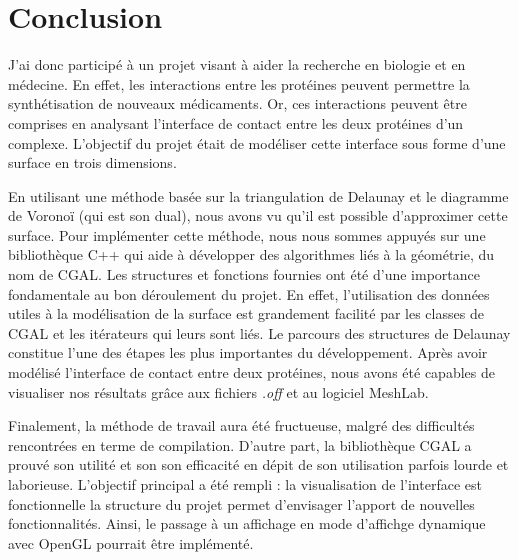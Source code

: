\chapter*{Conclusion}

J'ai donc participé à un projet visant à aider la recherche en biologie et en médecine.
En effet, les interactions entre les protéines peuvent permettre la synthétisation de
nouveaux médicaments. Or, ces interactions peuvent être comprises en analysant l'interface
de contact entre les deux protéines d'un complexe. L'objectif du projet était de modéliser
cette interface sous forme d'une surface en trois dimensions.

En utilisant une méthode basée sur la triangulation de Delaunay et le diagramme de
Voronoï (qui est son dual), nous avons vu qu'il est possible d'approximer cette surface.
Pour implémenter cette méthode, nous nous sommes appuyés sur une bibliothèque C++ qui
aide à développer des algorithmes liés à la géométrie, du nom de CGAL. Les structures et fonctions fournies
ont été d'une importance fondamentale au bon déroulement du projet. En effet, l'utilisation
des données utiles à la modélisation de la surface est grandement facilité par les classes de CGAL
et les itérateurs qui leurs sont liés. Le parcours des structures de Delaunay constitue
l'une des étapes les plus importantes du développement.
Après avoir modélisé l'interface de contact entre deux protéines, nous avons été capables
de visualiser nos résultats grâce aux fichiers \textit{.off} et au logiciel MeshLab.

Finalement, la méthode de travail aura été fructueuse, malgré des difficultés rencontrées
en terme de compilation. D'autre part, la bibliothèque CGAL a prouvé son utilité
et son son efficacité en dépit de son utilisation parfois lourde et laborieuse.
L'objectif principal a été rempli : la visualisation de l'interface est fonctionnelle
la structure du projet permet d'envisager l'apport de nouvelles fonctionnalités.
Ainsi, le passage à un affichage en mode d'affichge dynamique avec OpenGL pourrait être
implémenté.
